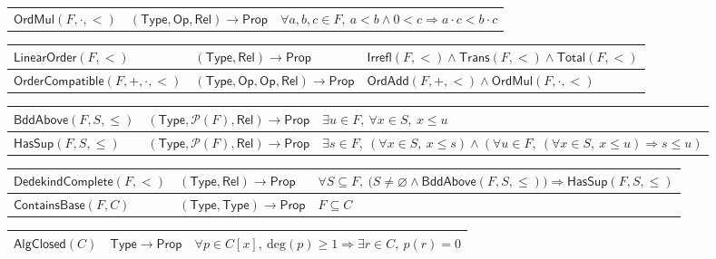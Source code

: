 \documentclass[11pt,reqno]{amsart}
\theoremstyle{blueplain}
\numberwithin{equation}{section}
\begin{document}
{\begin{tabular}{|m{4cm}|m{5cm}|m{9cm}|}
		$\mathsf{OrdMul}(F,\cdot,<)$ & $(\mathsf{Type},\mathsf{Op},\mathsf{Rel})\to\mathsf{Prop}$ &
		$\forall a,b,c\in F,\ a<b\wedge 0<c\Rightarrow a\cdot c<b\cdot c$ \\ 
	\end{tabular}
	\noindent \newline
	\noindent
	\begin{tabular}{|m{4cm}|m{5cm}|m{9cm}|}
		\hline
		$\mathsf{LinearOrder}(F,<)$ & $(\mathsf{Type},\mathsf{Rel})\to\mathsf{Prop}$ &
		$\mathsf{Irrefl}(F,<)\wedge\mathsf{Trans}(F,<)\wedge\mathsf{Total}(F,<)$ \\ \hline
		$\mathsf{OrderCompatible}(F,+,\cdot,<)$ & $(\mathsf{Type},\mathsf{Op},\mathsf{Op},\mathsf{Rel})\to\mathsf{Prop}$ &
		$\mathsf{OrdAdd}(F,+,<)\wedge\mathsf{OrdMul}(F,\cdot,<)$ \\ 
	\end{tabular}%
	\noindent \newline
	\noindent
	\begin{tabular}{|m{4cm}|m{5cm}|m{9cm}|}
		\hline
		$\mathsf{BddAbove}(F,S,\leq)$ & $(\mathsf{Type},\mathcal{P}(F),\mathsf{Rel})\to\mathsf{Prop}$ &
		$\exists u\in F,\ \forall x\in S,\ x\leq u$ \\ \hline
		$\mathsf{HasSup}(F,S,\leq)$ & $(\mathsf{Type},\mathcal{P}(F),\mathsf{Rel})\to\mathsf{Prop}$ &
		$\exists s\in F,\ (\forall x\in S,\ x\leq s)\wedge
		(\forall u\in F,\ (\forall x\in S,\ x\leq u)\Rightarrow s\leq u)$ \\ 
	\end{tabular}
	\noindent \newline
	\noindent
	\begin{tabular}{|m{4cm}|m{5cm}|m{9cm}|}
		\hline
		$\mathsf{DedekindComplete}(F,<)$ & $(\mathsf{Type},\mathsf{Rel})\to\mathsf{Prop}$ &
		$\forall S\subseteq F,\ \bigl(S\neq\varnothing\wedge
		\mathsf{BddAbove}(F,S,\leq)\bigr)\Rightarrow\mathsf{HasSup}(F,S,\leq)$ \\ \hline
		$\mathsf{ContainsBase}(F,C)$ & $(\mathsf{Type},\mathsf{Type})\to\mathsf{Prop}$ &
		$F\subseteq C$ \\ 
	\end{tabular}%
	\noindent \newline
	\noindent
	\begin{tabular}{|m{4cm}|m{5cm}|m{9cm}|}
		\hline
		$\mathsf{AlgClosed}(C)$ & $\mathsf{Type}\to\mathsf{Prop}$ &
		$\forall p\in C[x],\ \mathrm{deg}(p)\geq 1\Rightarrow\exists r\in C,\ p(r)=0$ \\ \hline

\end{tabular}}
\end{document}
